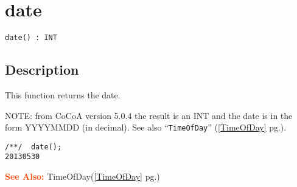 \documentclass[a4paper]{mybook}
\newenvironment{command}{}{} %
\newcommand\SeeAlso{\par\textcolor{OrangeRed}{\textbf{\large See Also: }}}
\begin{document}
\section{date}
\label{date}
\begin{command} %


\begin{Verbatim}[label=syntax, rulecolor=\color{MidnightBlue},
frame=single]
date() : INT
\end{Verbatim}


\subsection*{Description}

This function returns the date.
\par 
NOTE: from CoCoA version 5.0.4 the result is an INT and the date is in
the form YYYYMMDD (in decimal).
See also ``\verb&TimeOfDay&'' (\ref{TimeOfDay} pg.\pageref{TimeOfDay}).
\begin{Verbatim}[label=example, rulecolor=\color{PineGreen}, frame=single]
/**/  date();
20130530
\end{Verbatim}


\SeeAlso %
  TimeOfDay(\ref{TimeOfDay} pg.\pageref{TimeOfDay})
\end{command} %
\end{document}
